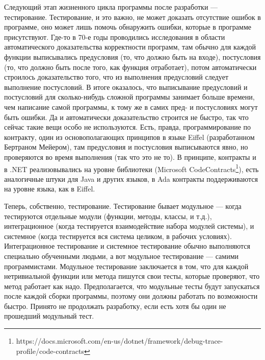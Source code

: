 \documentclass{../../text-style}
\begin{document}
Следующий этап жизненного цикла программы после разработки --- тестирование. Тестирование, и это важно, не может доказать отсутствие ошибок в программе, оно может лишь помочь обнаружить ошибки, которые в программе присутствуют. Где-то в 70-е годы проводились исследования в области автоматического доказательства корректности программ, там обычно для каждой функции выписывались предусловия (то, что должно быть на входе), постусловия (то, что должно быть после того, как функция отработает), потом автоматически строилось доказательство того, что из выполнения предусловий следует выполнение постусловий. В итоге оказалось, что выписывание предусловий и постусловий для сколько-нибудь сложной программы занимает больше времени, чем написание самой программы, к тому же в самих пред- и постусловиях могут быть ошибки. Да и автоматически доказательство строится не быстро, так что сейчас такие вещи особо не используются. Есть, правда, программирование по контракту, один из основополагающих принципов в языке Eiffel (разработанном Бертраном Мейером), там предусловия и постусловия выписываются явно, но проверяются во время выполнения (так что это не то). В принципе, контракты и в .NET реализовывались на уровне библиотеки (Microsoft CodeContracts\footnote{https://docs.microsoft.com/en-us/dotnet/framework/debug-trace-profile/code-contracts}), есть аналогичные штуки для Java и других языков, в Ada контракты поддерживаются на уровне языка, как в Eiffel.

Теперь, собственно, тестирование. Тестирование бывает модульное --- когда тестируются отдельные модули (функции, методы, классы, и т.д.), интеграционное (когда тестируется взаимодействие набора модулей системы), и системное (когда тестируется вся система целиком, в рабочих условиях). Интеграционное тестирование и системное тестирование обычно выполняются специально обученными людьми, а вот модульное тестирование --- самими программистами. Модульное тестирование заключается в том, что для каждой нетривиальной функции или метода пишутся свои тесты, которые проверяют, что метод работает как надо. Предполагается, что модульные тесты будут запускаться после каждой сборки программы, поэтому они должны работать по возможности быстро. Принято не продолжать разработку, если есть хотя бы один не прошедший модульный тест.
\end{document}
